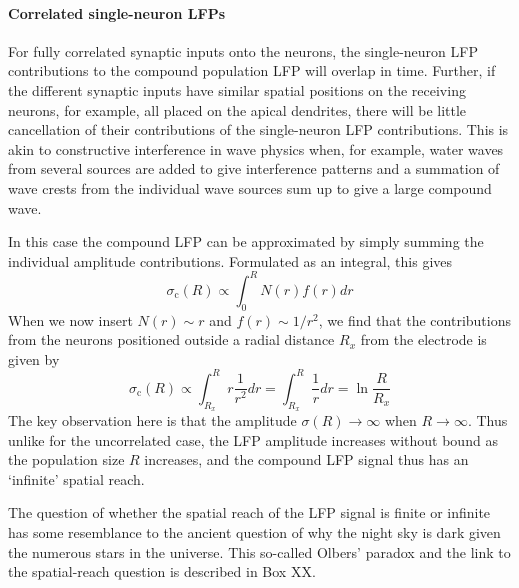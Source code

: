 \paragraph{Correlated single-neuron LFPs}

For fully correlated synaptic inputs onto the neurons, the single-neuron LFP contributions to the compound population LFP will overlap in time.
Further, if the different synaptic inputs have similar spatial positions on the receiving neurons, for example, all placed on the apical dendrites,  there will be little cancellation of their contributions of the single-neuron LFP contributions. 
This is akin to constructive interference in wave physics when, for example, water waves from several sources are added to give interference patterns and a summation of wave crests from the individual wave sources sum up to give a large compound wave.

In this case the compound LFP can be 
approximated by simply summing the individual amplitude contributions. Formulated as an integral, this gives
\begin{equation}
\sigma_\text{c}(R) \propto \int_0^R N(r) f(r) dr 
\label{LFP:equation:sigmaR-correlated-integral}
\end{equation}
When we now insert $N(r) \sim r$ and $f(r) \sim 1/r^2$, we find that the contributions from the neurons
positioned outside a radial distance $R_x$ from the electrode is given by
\begin{equation}
\sigma_\text{c}(R) \propto \int_{R_x}^R r \frac{1}{r^2} dr =  \int_{R_x}^R \frac{1}{r} dr = \ln \frac{R}{R_x} 
\label{LFP:equation:sigmaR-correlated-integral-2}
\end{equation}
The key observation here is that the amplitude $\sigma (R) \rightarrow \infty$ when $R \rightarrow \infty$.
Thus unlike for the uncorrelated case, the LFP amplitude increases without bound as the population size $R$ increases, 
and the compound LFP signal thus has an `infinite' spatial reach.

The question of whether the spatial reach of the LFP signal is finite or infinite has some resemblance to  
the ancient question of why the night sky is dark given the numerous stars in the universe. This so-called
Olbers' paradox and the link to the spatial-reach question is described in Box XX.


